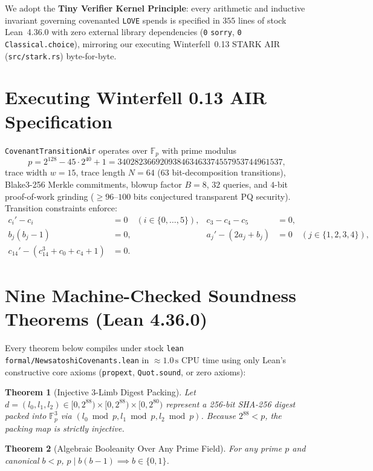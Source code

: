 \documentclass[11pt,a4paper]{article}
\newtheorem{theorem}{Theorem}
\begin{document}
We adopt the \textbf{Tiny Verifier Kernel Principle}: every arithmetic and inductive invariant governing covenanted \texttt{LOVE} spends is specified in $355$ lines of stock Lean~4.36.0 with zero external library dependencies (\texttt{0} \texttt{sorry}, \texttt{0} \texttt{Classical.choice}), mirroring our executing Winterfell~0.13 STARK AIR (\texttt{src/stark.rs}) byte-for-byte.

\section{Executing Winterfell 0.13 AIR Specification}
\texttt{CovenantTransitionAir} operates over $\mathbb{F}_p$ with prime modulus
\[
p = 2^{128} - 45 \cdot 2^{40} + 1 = 340282366920938463463374557953744961537,
\]
trace width $w=15$, trace length $N=64$ ($63$ bit-decomposition transitions), Blake3-256 Merkle commitments, blowup factor $B=8$, $32$ queries, and $4$-bit proof-of-work grinding ($\ge 96$--$100$ bits conjectured transparent PQ security). Transition constraints enforce:
\begin{align*}
c_i' - c_i &= 0 \quad (i \in \{0,\dots,5\}), & c_3 - c_4 - c_5 &= 0, \\
b_j(b_j - 1) &= 0, & a_j' - (2a_j + b_j) &= 0 \quad (j \in \{1,2,3,4\}), \\
c_{14}' - (c_{14}^3 + c_0 + c_4 + 1) &= 0.
\end{align*}

\section{Nine Machine-Checked Soundness Theorems (Lean 4.36.0)}
Every theorem below compiles under stock \texttt{lean formal/NewsatoshiCovenants.lean} in $\approx 1.0\,\text{s}$ CPU time using only Lean's constructive core axioms (\texttt{propext}, \texttt{Quot.sound}, or zero axioms):

\begin{theorem}[Injective 3-Limb Digest Packing]
Let $d = (l_0, l_1, l_2) \in [0,2^{88}) \times [0,2^{88}) \times [0,2^{80})$ represent a 256-bit SHA-256 digest packed into $\mathbb{F}_p^3$ via $(l_0 \bmod p, l_1 \bmod p, l_2 \bmod p)$. Because $2^{88} < p$, the packing map is strictly injective.
\end{theorem}

\begin{theorem}[Algebraic Booleanity Over Any Prime Field]
For any prime $p$ and canonical $b < p$, $p \mid b(b-1) \implies b \in \{0, 1\}$.
\end{theorem}
\end{document}
